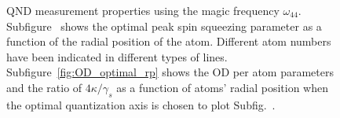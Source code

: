 \begin{figure}
\begin{minipage}{.49\linewidth}
\centering
{}
\end{minipage}
\begin{minipage}{.49\linewidth}
\centering
{}
\end{minipage}
\caption{QND measurement properties using the magic frequency $ \omega_{44} $. Subfigure~\protect{} shows the optimal peak spin squeezing parameter as a function of the radial position of the atom. Different atom numbers have been indicated in different types of lines. Subfigure~\ref{fig:OD_optimal_rp} shows the OD per atom parameters and the ratio of $ 4\kappa/\gamma_s $ as a function of atoms' radial position when the optimal quantization axis is chosen to plot Subfig.~\protect{}.}\label{fig:QNDproperty_magic44}
\end{figure}
